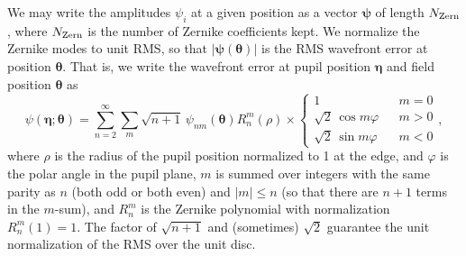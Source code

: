 \documentclass[aps,prd, amsmath,amssymb,superscriptaddress,showkeys,nofootinbib,reprint,preprintnumbers]{revtex4-1}
\begin{document}
\begin{widetext}
We may write the amplitudes $\psi_i$ at a given position as a vector
${\boldsymbol\psi}$ of length $N_{\rm Zern}$, where $N_{\rm Zern}$ is
the number of Zernike coefficients kept. We normalize the Zernike
modes to unit RMS, so that $|{\boldsymbol\psi}({\boldsymbol\theta})|$
is the RMS wavefront error at position ${\boldsymbol\theta}$. That is,
we write the wavefront error at pupil position ${\boldsymbol\eta}$ and
field position ${\boldsymbol\theta}$ as
\begin{equation}
\psi({\boldsymbol\eta};{\boldsymbol\theta}) = \sum_{n=2}^\infty
\sum_{m} \sqrt{n+1}\,\psi_{nm}({\boldsymbol\theta}) R_n^m(\rho)
\times\left\{\begin{array}{ccc} 1 & & m=0 \\ \sqrt2\,\cos m\varphi & &
m>0 \\ \sqrt2\,\sin m\varphi & & m<0 \end{array} \right.,
\end{equation}
where $\rho$ is the radius of the pupil position normalized to 1 at
the edge, and $\varphi$ is the polar angle in the pupil plane, $m$ is
summed over integers with the same parity as $n$ (both odd or both
even) and $|m|\le n$ (so that there are $n+1$ terms in the $m$-sum),
and $R_n^m$ is the Zernike polynomial with normalization
$R_n^m(1)=1$. The factor of $\sqrt{n+1}$ and (sometimes) $\sqrt2$
guarantee the unit normalization of the RMS over the unit disc.


\end{widetext}
\end{document}
